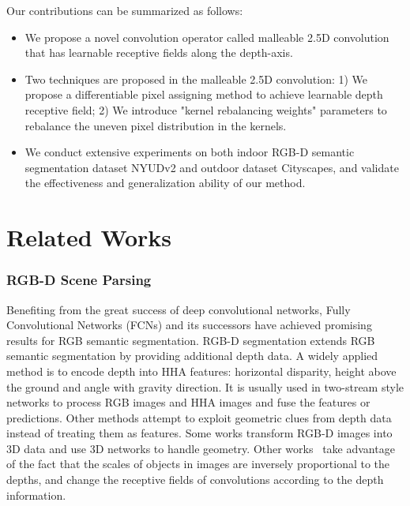 \documentclass[runningheads]{llncs}
\begin{document}
Our contributions can be summarized as follows:
\begin{itemize}
  \item We propose a novel convolution operator called malleable 2.5D convolution that has learnable receptive fields along the depth-axis.
  \item Two techniques are proposed in the malleable 2.5D convolution: 1) We propose a differentiable pixel assigning method to achieve learnable depth receptive field;
  2) We introduce "kernel rebalancing weights" parameters to rebalance the uneven pixel distribution in the kernels.
  \item We conduct extensive experiments on both indoor RGB-D semantic segmentation dataset NYUDv2\cite{NYUDv2} and outdoor dataset Cityscapes\cite{Cityscapes}, and validate the effectiveness and generalization ability of our method.
\end{itemize}

\section{Related Works}
\subsubsection{RGB-D Scene Parsing}
Benefiting from the great success of deep convolutional networks\cite{AlexNet,VGGNet,ResNet}, Fully Convolutional Networks (FCNs)\cite{FCN} and its successors\cite{DeepLabv2,RefineNet,DeepLabv3plus,SegModel,PSPNet,DilatedNet} have achieved promising results for RGB semantic segmentation.
RGB-D segmentation extends RGB semantic segmentation by providing additional depth data.
A widely applied method is to encode depth into HHA features\cite{HHA}: horizontal disparity, height above the ground and angle with gravity direction.
It is usually used in two-stream style networks\cite{FCN_PAMI,HHA,LSTM-CF,FuseNet,RDFNet,Coupling} to process RGB images and HHA images and fuse the features or predictions.
Other methods attempt to exploit geometric clues from depth data instead of treating them as features.
Some works\cite{SongYZCSF17,ZhongDL18,3DGNN} transform RGB-D images into 3D data and use 3D networks to handle geometry.
Other works~\cite{CFN,3DN,KongF18,mm2018-KangLN18} take advantage of the fact that the scales of objects in images are inversely proportional to the depths, and change the receptive fields of convolutions according to the depth information.
\end{document}
